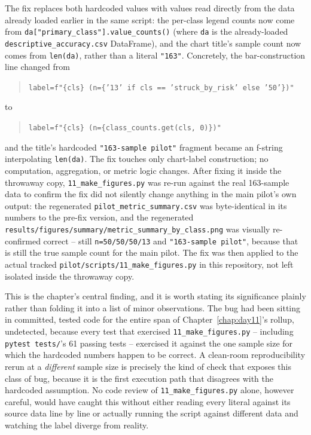 The fix replaces both hardcoded values with values read directly from the data already loaded
earlier in the same script: the per-class legend counts now come from
\texttt{da["primary\_class"].value\_counts()} (where \texttt{da} is the already-loaded
\texttt{descriptive\_accuracy.csv} DataFrame), and the chart title's sample count now comes from
\texttt{len(da)}, rather than a literal \texttt{"163"}. Concretely, the bar-construction line changed
from
\begin{quote}
\texttt{label=f"\{cls\} (n=\{'13' if cls == 'struck\_by\_risk' else '50'\})"}
\end{quote}
to
\begin{quote}
\texttt{label=f"\{cls\} (n=\{class\_counts.get(cls, 0)\})"}
\end{quote}
and the title's hardcoded \texttt{"163-sample pilot"} fragment became an f-string interpolating
\texttt{len(da)}. The fix touches only chart-label construction; no computation, aggregation, or
metric logic changes. After fixing it inside the throwaway copy, \texttt{11\_make\_figures.py} was
re-run against the real 163-sample data to confirm the fix did not silently change anything in the
main pilot's own output: the regenerated \texttt{pilot\_metric\_summary.csv} was byte-identical in
its numbers to the pre-fix version, and the regenerated
\texttt{results/figures/summary/metric\_summary\_by\_class.png} was visually re-confirmed correct --
still \texttt{n=50/50/50/13} and \texttt{"163-sample pilot"}, because that is still the true sample
count for the main pilot. The fix was then applied to the actual tracked
\texttt{pilot/scripts/11\_make\_figures.py} in this repository, not left isolated inside the
throwaway copy.

This is the chapter's central finding, and it is worth stating its significance plainly rather than
folding it into a list of minor observations. The bug had been sitting in committed, tested code for
the entire span of Chapter~\ref{chap:day11}'s rollup, undetected, because every test that exercised
\texttt{11\_make\_figures.py} -- including \texttt{pytest tests/}'s 61 passing tests -- exercised it
against the one sample size for which the hardcoded numbers happen to be correct. A clean-room
reproducibility rerun at a \emph{different} sample size is precisely the kind of check that exposes
this class of bug, because it is the first execution path that disagrees with the hardcoded
assumption. No code review of \texttt{11\_make\_figures.py} alone, however careful, would have caught
this without either reading every literal against its source data line by line or actually running
the script against different data and watching the label diverge from reality.

